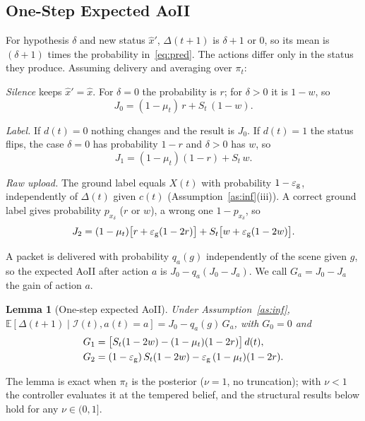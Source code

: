 \documentclass[10pt,journal,compsoc]{IEEEtran}
\newtheorem{lemma}{Lemma}
\theoremstyle{remark}
\newcommand{\E}{\mathbb{E}}
\newcommand{\I}{\mathcal{I}}
\newcommand{\ee}{\varepsilon}
\newcommand{\xh}{\hat{x}}
\begin{document}
\subsection{One-Step Expected AoII}
For hypothesis $\delta$ and new status $\xh'$, $\Delta(t+1)$ is $\delta+1$ or $0$, so its mean is $(\delta+1)$ times the probability in~\eqref{eq:pred}. The actions differ only in the status they produce. Assuming delivery and averaging over $\pi_t$:

\emph{Silence} keeps $\xh'=\xh$. For $\delta=0$ the probability is $r$; for $\delta>0$ it is $1-w$, so
\begin{equation}\label{eq:J0}
J_0=(1-\mu_t)\,r+S_t\,(1-w).
\end{equation}

\emph{Label.} If $d(t)=0$ nothing changes and the result is $J_0$. If $d(t)=1$ the status flips, the case $\delta=0$ has probability $1-r$ and $\delta>0$ has $w$, so
\begin{equation}\label{eq:J1}
J_1=(1-\mu_t)(1-r)+S_t\,w.
\end{equation}

\emph{Raw upload.} The ground label equals $X(t)$ with probability $1-\ee_{\rm g}$, independently of $\Delta(t)$ given $c(t)$ (Assumption~\ref{as:inf}(iii)). A correct ground label gives probability $p_{x_\delta}$ ($r$ or $w$), a wrong one $1-p_{x_\delta}$, so
\begin{equation}\label{eq:J2}
J_2=(1-\mu_t)\big[r+\ee_{\rm g}(1-2r)\big]+S_t\big[w+\ee_{\rm g}(1-2w)\big].
\end{equation}

A packet is delivered with probability $q_a(g)$ independently of the scene given $g$, so the expected AoII after action $a$ is $J_0-q_a(J_0-J_a)$. We call $G_a=J_0-J_a$ the gain of action $a$.

\begin{lemma}[One-step expected AoII]\label{lem:onestep}
Under Assumption~\ref{as:inf}, $\E[\Delta(t+1)\mid\I(t),a(t)=a]=J_0-q_a(g)\,G_a$, with $G_0=0$ and
\begin{align}
G_1&=\big[S_t(1-2w)-(1-\mu_t)(1-2r)\big]\,d(t), \label{eq:G1}\\
G_2&=(1-\ee_{\rm g})\,S_t(1-2w)-\ee_{\rm g}\,(1-\mu_t)(1-2r). \label{eq:G2}
\end{align}
\end{lemma}

The lemma is exact when $\pi_t$ is the posterior ($\nu=1$, no truncation); with $\nu<1$ the controller evaluates it at the tempered belief, and the structural results below hold for any $\nu\in(0,1]$.
\end{document}
